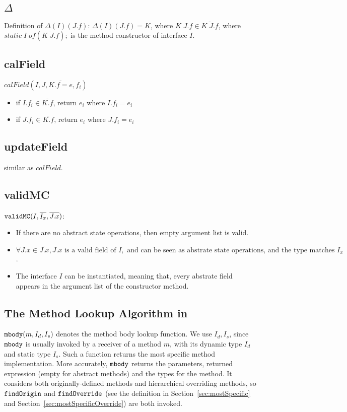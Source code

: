 \subsection{$\Delta$}

Definition of $\Delta(I)(J.f)$:
$\Delta(I)(J.f) = K$, where $K \; J.f \in \overline{K \; J.f}$, where $static \; I \; of (\overline{K \; J.f});$ is the method constructor of interface $I$.

\subsection{calField}
$ calField(I, J, \overline{K.f=e}, f_i)$
\begin{itemize}
	\item if $I.f_i \in \overline{K.f}$, return $e_i$ where $I.f_i = e_i$
	\item if $J.f_i \in \overline{K.f}$, return $e_i$ where $J.f_i = e_i$ 
\end{itemize}

\subsection{updateField}
similar as $calField$.

\subsection{validMC}
$\texttt{validMC}(I, \overline{I_x}, \overline{J.x}) $:
\begin{itemize}
	\item If there are no abstract state operations, then empty argument list is valid.
	\item $\forall J.x \in \overline{J.x}, J.x \text{ is a valid field of } I, \text{ and can be seen as abstrate state operations, and the type matches } I_x$.
	\item The interface $I$ can be instantiated, meaning that, every abstrate field appears in the argument list of the constructor method.
\end{itemize}

\subsection{The Method Lookup Algorithm in \mbody{}}\label{subsec:mbodydef}
$\texttt{mbody}(m, I_d, I_s)$ denotes the method body lookup function.
We use $I_d, I_s$, since $\texttt{mbody}$ is usually invoked by a receiver of a method $m$, with its dynamic type $I_d$ and static type $I_s$. Such a function returns the most specific method implementation. More
accurately, $\texttt{mbody}$ returns the parameters, returned expression
(empty for abstract methods) and the types for the method. It considers both originally-defined methods and hierarchical overriding methods, so $\texttt{findOrigin}$ and $\texttt{findOverride}$ (see the definition in Section~\ref{sec:mostSpecific} and Section~\ref{sec:mostSpecificOverride}) are both invoked.

